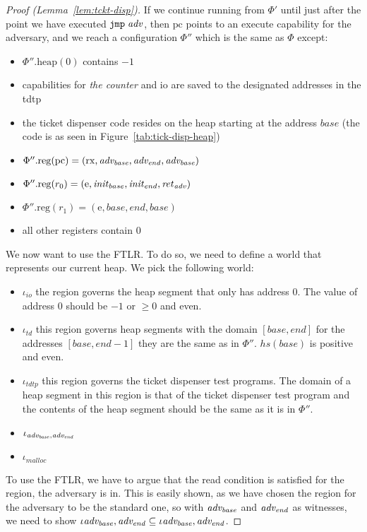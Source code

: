 \documentclass{article}
\newcommand{\var}[1]{\mathit{#1}}
\newcommand{\hs}{\var{hs}}
\newcommand{\pcreg}{\mathrm{pc}}
\newcommand{\plainproj}[1]{\mathrm{#1}}
\newcommand{\memheap}[1][\Phi]{#1.\plainproj{heap}}
\newcommand{\memreg}[1][\Phi]{#1.\plainproj{reg}}
\newcommand{\codelabel}[1]{\mathit{#1}}
\newcommand{\malloc}{\codelabel{malloc}}
\newcommand{\instr}[1]{\mathtt{#1}}
\newcommand{\oneinstr}[2]{\instr{#1} \; #2}
\newcommand{\jmp}[1]{\oneinstr{jmp}{#1}}
\newcommand{\plainperm}[1]{\mathrm{#1}}
\newcommand{\exec}{\plainperm{rx}}
\newcommand{\entry}{\plainperm{e}}
\begin{document}
\begin{proof}[Proof (Lemma~\ref{lem:tckt-disp})]
If we continue running from $\Phi'$ until just after the point we have executed $\jmp{\adv}$, then  $\pcreg$ points to an execute capability for the adversary, and  we reach a configuration $\Phi''$ which is the same as $\Phi$ except:
\begin{itemize}
\item $\memheap[\Phi''](0)$ contains $-1$
\item capabilities for \emph{the counter} and io are saved to the designated addresses in the tdtp
\item the ticket dispenser code resides on the heap starting at the address $\var{base}$ (the code is as seen in Figure~\ref{tab:tick-disp-heap})
\item $\memreg[\Phi''](\pcreg) = (\exec,\advb,\adve,\advb)$
\item $\memreg[\Phi''](r_0) = (\entry,\initb,\inite,\reta)$
\item $\memreg[\Phi''](r_1) = (\entry,\var{base},\var{end},\var{base})$
\item all other registers contain 0
\end{itemize}
We now want to use the FTLR. To do so, we need to define a world that represents our current heap. We pick the following world:
\begin{itemize}
\item $\iota_{\var{io}}$ the region governs the heap segment that only has address $0$. The value of address $0$ should be $-1$ or $\geq 0$ and even.  %
\item $\iota_{\var{td}}$ this region governs heap segments with the domain $[\var{base},\var{end}]$ for the addresses $[\var{base},\var{end} - 1]$ they are the same as in $\Phi''$. $\hs(\var{base})$ is positive and even.
\item $\iota_{\var{tdtp}}$ this region governs the ticket dispenser test programs. The domain of a heap segment in this region is that of the ticket dispenser test program and the contents of the heap segment should be the same as it is in $\Phi''$.
\item $\iota_{\advb,\adve}$
\item $\iota_{\malloc}$
\end{itemize}
To use the FTLR, we have to argue that the read condition is satisfied for the region, the adversary is in. This is easily shown, as we have chosen the region for the adversary to be the standard one, so with $\advb$ and $\adve$ as witnesses, we need to show $\iota{\advb,\adve} \subseteq \iota{\advb,\adve}$.


\end{proof}
\end{document}
